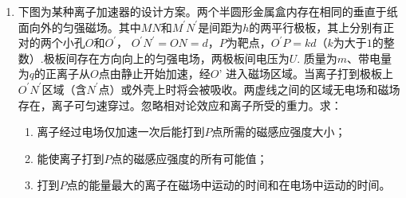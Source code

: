 \begin{enumerate}[leftmargin=0em]




\newpage
\item 
{}
下图为某种离子加速器的设计方案。两个半圆形金属盒内存在相同的垂直于纸面向外的匀强磁场。其中$ MN $和$ M ^{\prime} N ^{\prime} $是间距为$ h $的两平行极板，其上分别有正对的两个小孔$ O $和$ O ^{\prime} $，
$O ^ { \prime } N ^ { \prime } = O N = d$，$ P $为靶点，$ O ^{\prime} P=kd $（$ k $为大于$ 1 $的整数）.极板间存在方向向上的匀强电场，两极板间电压为$ U $. 质量为$ m $、带电量为$ q $的正离子从$ O $点由静止开始加速，经$ O $' 进入磁场区域。当离子打到极板上$ O ^{\prime} N ^{\prime} $区域（含$ N ^{\prime} $点）或外壳上时将会被吸收。两虚线之间的区域无电场和磁场存在，离子可匀速穿过。忽略相对论效应和离子所受的重力。求：
\begin{enumerate}
\renewcommand{\labelenumi}{\arabic{enumi}.}
\item
离子经过电场仅加速一次后能打到$ P $点所需的磁感应强度大小；
\item 
能使离子打到$ P $点的磁感应强度的所有可能值；
\item 
打到$ P $点的能量最大的离子在磁场中运动的时间和在电场中运动的时间。






\end{enumerate}
\end{enumerate}
